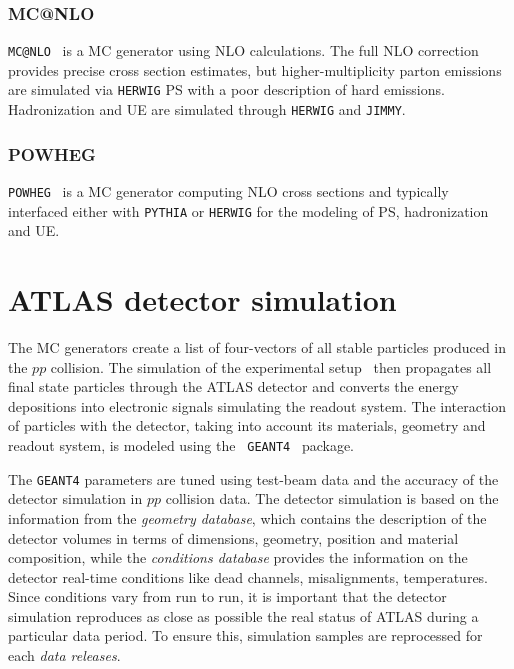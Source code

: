 \subsubsection*{MC@NLO}

\texttt{MC@NLO}~\cite{mcatnlo} is a MC generator using NLO
calculations. The full NLO correction provides precise cross section
estimates, but higher-multiplicity parton emissions are simulated via
\texttt{HERWIG} PS with a poor description of hard emissions. 
Hadronization and UE are simulated through \texttt{HERWIG} and
\texttt{JIMMY}.

\subsubsection*{POWHEG}

\texttt{POWHEG}~\cite{powheg} is a MC generator computing NLO cross
sections and typically interfaced either with \texttt{PYTHIA} or
\texttt{HERWIG} for the modeling of PS, hadronization and UE. 

\section{ATLAS detector simulation}
\label{sec:detectorsim}

The MC generators create a list of four-vectors of all stable
particles produced in the $pp$ collision. The simulation of the
experimental setup~\cite{atlas_sim} then propagates all final state
particles through the ATLAS detector and converts the energy
depositions into electronic signals simulating the readout system.
The interaction of particles with the detector, taking into account
its materials, geometry and readout system, is modeled using the {\tt
  GEANT4}~\cite{geant} package.

The \texttt{GEANT4} parameters are tuned using test-beam data and the
accuracy of the detector simulation in $pp$ collision data. The
detector simulation is based on the information from the {\it geometry
  database}, which contains the description of the detector volumes in
terms of dimensions, geometry, position and material composition, while
the {\it conditions database} provides the information
on the detector real-time conditions like dead channels, misalignments,
temperatures. Since conditions vary from run to run, it is important that
the detector simulation reproduces as close as possible the real status
of ATLAS during a particular data period. To ensure this,
simulation samples are reprocessed for each {\it data releases}.

